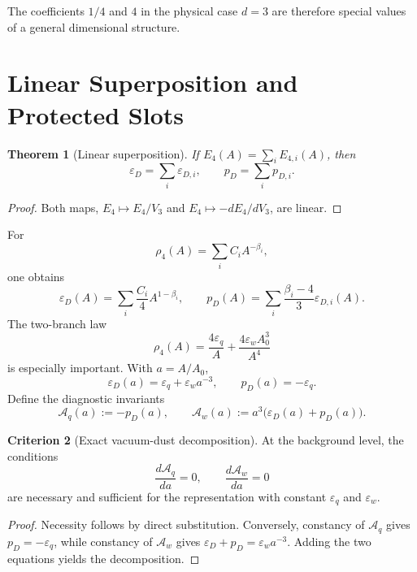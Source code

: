 \documentclass[11pt,a4paper]{article}
\def\dd{d}%
\numberwithin{equation}{section}
\theoremstyle{definition}
\newtheorem{criterion}{Criterion}
\theoremstyle{plain}
\newtheorem{theorem}[criterion]{Theorem}
\theoremstyle{remark}
\newcommand{\Efour}{E_4}
\newcommand{\rhoFour}{\rho_4}
\newcommand{\epsD}{\varepsilon_D}
\newcommand{\pD}{p_D}
\newcommand{\dd}{\mathrm{d}}
\begin{document}
The coefficients \(1/4\) and \(4\) in the physical case \(d=3\) are therefore special values of a general dimensional structure.

\section{Linear Superposition and Protected Slots}
\begin{theorem}[Linear superposition]
If \(\Efour(A)=\sum_i E_{4,i}(A)\), then
\begin{equation}
\epsD=\sum_i \varepsilon_{D,i},
\qquad
\pD=\sum_i p_{D,i}.
\end{equation}
\end{theorem}
\begin{proof}
Both maps, \(\Efour\mapsto \Efour/V_3\) and \(\Efour\mapsto -\dd\Efour/\dd V_3\), are linear.
\end{proof}

For
\begin{equation}
\rhoFour(A)=\sum_i C_iA^{-\beta_i},
\end{equation}
one obtains
\begin{equation}
\epsD(A)=\sum_i \frac{C_i}{4}A^{1-\beta_i},
\qquad
\pD(A)=\sum_i \frac{\beta_i-4}{3}\varepsilon_{D,i}(A).
\end{equation}
The two-branch law
\begin{equation}
\rhoFour(A)=\frac{4\varepsilon_q}{A}+\frac{4\varepsilon_wA_0^3}{A^4}
\end{equation}
is especially important. With \(a=A/A_0\),
\begin{equation}
\epsD(a)=\varepsilon_q+\varepsilon_w a^{-3},
\qquad
\pD(a)=-\varepsilon_q.
\end{equation}
Define the diagnostic invariants
\begin{equation}
\mathcal{A}_q(a):=-\pD(a),
\qquad
\mathcal{A}_w(a):=a^3\bigl(\epsD(a)+\pD(a)\bigr).
\end{equation}

\begin{criterion}[Exact vacuum-dust decomposition]
At the background level, the conditions
\begin{equation}
\frac{\dd\mathcal{A}_q}{\dd a}=0,
\qquad
\frac{\dd\mathcal{A}_w}{\dd a}=0
\end{equation}
are necessary and sufficient for the representation with constant \(\varepsilon_q\) and \(\varepsilon_w\).
\end{criterion}
\begin{proof}
Necessity follows by direct substitution. Conversely, constancy of \(\mathcal{A}_q\) gives \(\pD=-\varepsilon_q\), while constancy of \(\mathcal{A}_w\) gives \(\epsD+
\pD=\varepsilon_w a^{-3}\). Adding the two equations yields the decomposition.
\end{proof}
\end{document}
